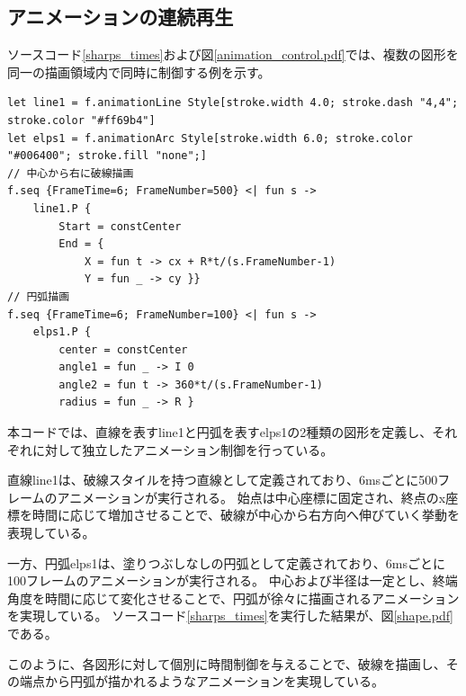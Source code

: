 \subsection{アニメーションの連続再生}
ソースコード\ref{sharps_times}および図\ref{animation_control.pdf}では、複数の図形を同一の描画領域内で同時に制御する例を示す。
 \begin{lstlisting}[caption={アニメーションの連続再生（fsxファイル）},label={sharps_times},breaklines=true,breakatwhitespace=false]
let line1 = f.animationLine Style[stroke.width 4.0; stroke.dash "4,4"; stroke.color "#ff69b4"]
let elps1 = f.animationArc Style[stroke.width 6.0; stroke.color "#006400"; stroke.fill "none";]
// 中心から右に破線描画
f.seq {FrameTime=6; FrameNumber=500} <| fun s ->
    line1.P {
        Start = constCenter
        End = {
            X = fun t -> cx + R*t/(s.FrameNumber-1)
            Y = fun _ -> cy }}
// 円弧描画
f.seq {FrameTime=6; FrameNumber=100} <| fun s ->
    elps1.P {
        center = constCenter
        angle1 = fun _ -> I 0
        angle2 = fun t -> 360*t/(s.FrameNumber-1)
        radius = fun _ -> R }
\end{lstlisting}
本コードでは、直線を表すline1と円弧を表すelps1の2種類の図形を定義し、それぞれに対して独立したアニメーション制御を行っている。
\par
直線line1は、破線スタイルを持つ直線として定義されており、6msごとに500フレームのアニメーションが実行される。
始点は中心座標に固定され、終点のx座標を時間に応じて増加させることで、破線が中心から右方向へ伸びていく挙動を表現している。
\par
一方、円弧elps1は、塗りつぶしなしの円弧として定義されており、6msごとに100フレームのアニメーションが実行される。
中心および半径は一定とし、終端角度を時間に応じて変化させることで、円弧が徐々に描画されるアニメーションを実現している。
ソースコード\ref{sharps_times}を実行した結果が、図\ref{shape.pdf}である。
\par
このように、各図形に対して個別に時間制御を与えることで、破線を描画し、その端点から円弧が描かれるようなアニメーションを実現している。

